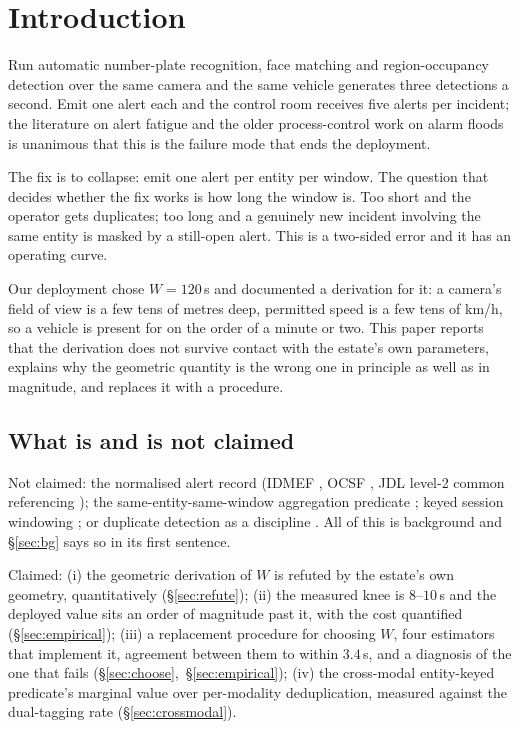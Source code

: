 \documentclass[11pt,a4paper]{article}
\begin{document}
\section{Introduction}

Run automatic number-plate recognition, face matching and region-occupancy
detection over the same camera and the same vehicle generates three detections a
second. Emit one alert each and the control room receives five alerts per
incident; the literature on alert fatigue \citep{tariq2025alertfatigue,
alahmadi2022falsepositives, sundaramurthy2015burnout} and the older process-control
work on alarm floods \citep{wang2016alarmoverview, isa182, eemua191} is unanimous
that this is the failure mode that ends the deployment.

The fix is to collapse: emit one alert per entity per window. The question that
decides whether the fix works is how long the window is. Too short and the
operator gets duplicates; too long and a genuinely new incident involving the same
entity is masked by a still-open alert. This is a two-sided error and it has an
operating curve.

Our deployment chose $W = 120$\,s and documented a derivation for it: a camera's
field of view is a few tens of metres deep, permitted speed is a few tens of
km/h, so a vehicle is present for on the order of a minute or two. This paper
reports that the derivation does not survive contact with the estate's own
parameters, explains why the geometric quantity is the wrong one in principle as
well as in magnitude, and replaces it with a procedure.

\subsection{What is and is not claimed}

Not claimed: the normalised alert record (IDMEF \citep{idmef2007}, OCSF
\citep{ocsf}, JDL level-2 common referencing \citep{steinberg1999jdl,
hall1997introduction}); the same-entity-same-window aggregation predicate
\citep{debar2001aggregation, julisch2003clustering, valdes2001probabilistic};
keyed session windowing \citep{akidau2015dataflow, cugola2012processing}; or
duplicate detection as a discipline \citep{fellegi1969theory,
elmagarmid2007duplicate}. All of this is background and \S\ref{sec:bg} says so in
its first sentence.

Claimed: (i) the geometric derivation of $W$ is refuted by the estate's own
geometry, quantitatively (\S\ref{sec:refute}); (ii) the measured knee is
$8$--$10$\,s and the deployed value sits an order of magnitude past it, with the
cost quantified (\S\ref{sec:empirical}); (iii) a replacement procedure for
choosing $W$, four estimators that implement it, agreement between them to
within $3.4$\,s, and a diagnosis of the one that fails
(\S\ref{sec:choose},~\S\ref{sec:empirical}); (iv) the cross-modal entity-keyed predicate's marginal value
over per-modality deduplication, measured against the dual-tagging rate
(\S\ref{sec:crossmodal}).
\end{document}
